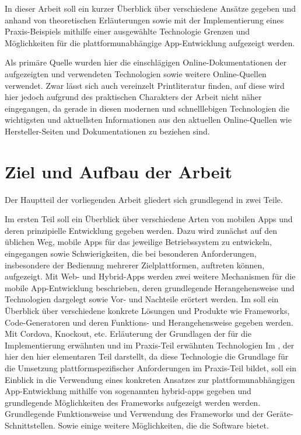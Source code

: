 In dieser Arbeit soll ein kurzer Überblick über verschiedene Ansätze gegeben und anhand von theoretischen Erläuterungen sowie mit der Implementierung eines Praxis-Beispiels mithilfe einer ausgewählte Technologie Grenzen und Möglichkeiten für die plattformunabhängige App-Entwicklung aufgezeigt werden.


	Als primäre Quelle wurden hier die einschlägigen Online-Dokumentationen der aufgezeigten und verwendeten Technologien sowie weitere Online-Quellen verwendet. 
	Zwar lässt sich auch vereinzelt Printliteratur finden, auf diese wird hier jedoch aufgrund des praktischen Charakters der Arbeit nicht näher eingegangen, da gerade in diesen modernen und schnelllebigen Technologien die wichtigsten und aktuellsten Informationen aus den aktuellen Online-Quellen wie Hersteller-Seiten und Dokumentationen zu beziehen sind.
	
\section{Ziel und Aufbau der Arbeit}


Der Hauptteil der vorliegenden Arbeit gliedert sich grundlegend in zwei Teile.

Im ersten Teil  soll ein Überblick über verschiedene Arten von mobilen Apps und deren prinzipielle Entwicklung gegeben werden. 
		Dazu wird zunächst auf den üblichen Weg, mobile Apps für das jeweilige Betriebssystem zu entwickeln, eingegangen sowie Schwierigkeiten, die bei besonderen Anforderungen, insbesondere der Bedienung mehrerer Zielplattformen, auftreten können, aufgezeigt.
		Mit Web- und Hybrid-Apps werden zwei weitere Mechanismen für die mobile App-Entwicklung beschrieben, deren grundlegende Herangehensweise und Technologien dargelegt sowie Vor- und Nachteile erörtert werden.
	Im  soll ein Überblick über verschiedene konkrete Lösungen und Produkte wie Frameworks, Code-Generatoren und deren Funktions- und Herangehensweise gegeben werden.
	Mit Cordova, Knockout, etc. Erläuterung der Grundlagen der für die Implementierung erwähnten und im Praxis-Teil erwähnten Technologien
	Im , der hier den hier elementaren Teil darstellt, da diese Technologie die Grundlage für die Umsetzung plattformspezifischer Anforderungen im Praxis-Teil bildet, soll ein Einblick in die Verwendung eines konkreten Ansatzes zur plattformunabhängigen App-Entwicklung mithilfe von sogenannten \glspl{hybrid-app} gegeben und grundlegende Möglichkeiten des Frameworks aufgezeigt werden werden.
	Grundlegende Funktionsweise und Verwendung des Frameworks und der Geräte-Schnittstellen.
	Sowie einige weitere Möglichkeiten, die die Software bietet.

